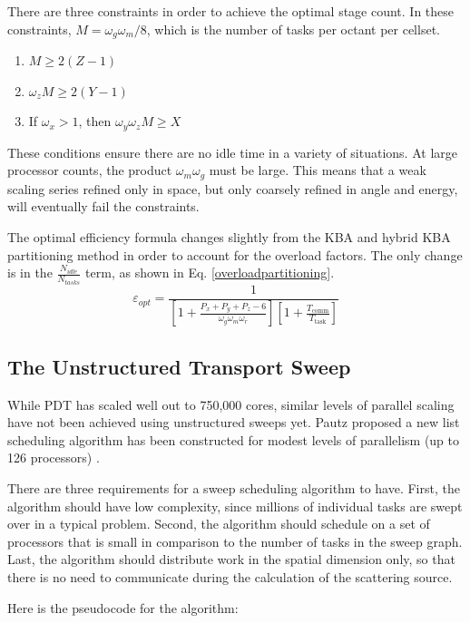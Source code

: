 \documentclass[11pt, letterpaper,titlepage,oneside]{article}
\begin{document}
There are three constraints in order to achieve the optimal stage count. In these constraints, $M = \omega_g \omega_m/8$, which is the number of tasks per octant per cellset.
\begin{enumerate}
\item $ M \geq 2(Z-1)$
\item $\omega_z M \geq 2(Y-1)$
\item If $\omega_x > 1$, then $\omega_y \omega_z M \geq X$
\end{enumerate}
These conditions ensure there are no idle time in a variety of situations. At large processor counts, the product $\omega_m \omega_g$ must be large. This means that a weak scaling series refined only in space, but only coarsely refined in angle and energy, will eventually fail the constraints.

The optimal efficiency formula changes slightly from the KBA and hybrid KBA partitioning method in order to account for the overload factors. The only change is in the $\frac{N_{idle}}{N_{tasks}}$ term, as shown in Eq. \ref{overloadpartitioning}.
\begin{equation}
\varepsilon_{opt} = \frac{1}{[1+\frac{P_x+P_y+P_z-6}{\omega_g \omega_m \omega_r}][1+\frac{T_{\text{comm}}}{T_{\text{task}}}]}
\label{overloadpartitioning}
\end{equation}


\subsection{The Unstructured Transport Sweep}
While PDT has scaled well out to 750,000 cores, similar levels of parallel scaling have not been achieved using unstructured sweeps yet. Pautz proposed a new list scheduling algorithm has been constructed for modest levels of parallelism (up to 126 processors)\cite{Pautz} .

There are three requirements for a sweep scheduling algorithm to have. First, the algorithm should have low complexity, since millions of individual tasks are swept over in a typical problem. Second, the algorithm should schedule on a set of processors that is small in comparison to the number of tasks in the sweep graph. Last, the algorithm should distribute work in the spatial dimension only, so that there is no need to communicate during the calculation of the scattering source. 

Here is the pseudocode for the algorithm:
\end{document}
